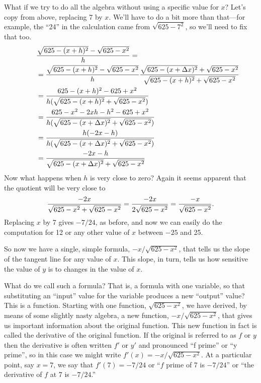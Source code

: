 What if we try to do all the algebra without using a specific
value for $x$? Let's copy from above, replacing 7 by  $x$. We'll have
to do a bit more than that---for example, 
the ``24'' in the calculation came from 
$\sqrt{625-7^2}$, so we'll need to fix that too.
\begin{align*}
&{\sqrt{625-(x+ h)^2} - \sqrt{625-x^2}\over  h}= \\
\qquad&={\sqrt{625-(x+ h)^2} - \sqrt{625-x^2}\over  h}{\sqrt{625-(x+\Delta
    x)^2}+\sqrt{625-x^2}\over \sqrt{625-(x+ h)^2}+\sqrt{625-x^2}} \\
&={625-(x+ h)^2-625+x^2\over  h(\sqrt{625-(x+ h)^2}+\sqrt{625-x^2})} \\
&={625-x^2-2x h- h^2-625+x^2\over   h(\sqrt{625-(x+\Delta
    x)^2}+\sqrt{625-x^2})} \\
&={ h(-2x- h)\over  h(\sqrt{625-(x+\Delta
    x)^2}+\sqrt{625-x^2})} \\
&= {-2x- h\over\sqrt{625-(x+\Delta
    x)^2}+\sqrt{625-x^2}} \\
\end{align*}
Now what happens when $h$ is very close to zero? Again it seems
apparent that the quotient will be very close to
$${-2x\over \sqrt{625-x^2}+\sqrt{625-x^2}}
={-2x\over 2\sqrt{625-x^2}}={-x\over \sqrt{625-x^2}}.
$$
Replacing $x$ by 7 gives $-7/24$, as before, and now we can easily do
the computation for 12  or any other value of
$x$ between $-25$ and 25.

So now we have a single, simple formula, ${-x/ \sqrt{625-x^2}}$,
that tells us the slope of the tangent line for any value of
$x$. This slope, in turn, tells us how sensitive the value of $y$ is
to changes in the value of $x$. 

What do we call such a formula? That is, a formula with one variable,
so that substituting an ``input'' value for the variable produces a
new ``output'' value? This is a function. Starting with one function,
$\sqrt{625-x^2}$, we have derived, by means of some slightly nasty
algebra, a new function, ${-x/ \sqrt{625-x^2}}$, that gives us
important information about the original function. This new function
in fact is called the {\dfont derivative} of the
original function. If the original is referred to as $f$ or $y$ then
the derivative is often written $f'$ or $y'$ and pronounced ``f
prime'' or ``y prime'', so in this case we might write $f'(x)=-x/
\sqrt{625-x^2}$. At a particular point, say $x=7$, we say that
$f'(7)=-7/24$ or ``$f$ prime of 7 is $-7/24$'' or ``the derivative of
$f$ at 7 is $-7/24$.''

